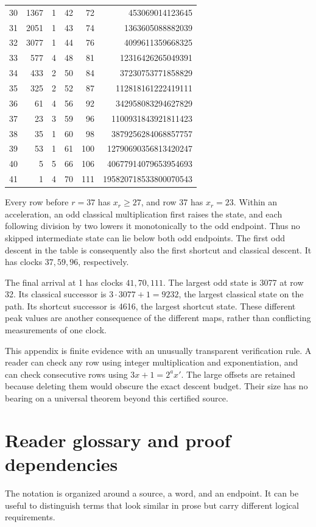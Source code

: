 \begin{longtable}{rrrrrr}
30&1367&1&42&72&453069014123645\\
31&2051&1&43&74&1363605088882039\\
32&3077&1&44&76&4099611359668325\\
33&577&4&48&81&12316426265049391\\
34&433&2&50&84&37230753771858829\\
35&325&2&52&87&112818161222419111\\
36&61&4&56&92&342958083294627829\\
37&23&3&59&96&1100931843921811423\\
38&35&1&60&98&3879256284068857757\\
39&53&1&61&100&12790690356813420247\\
40&5&5&66&106&40677914079653954693\\
41&1&4&70&111&195820718533800070543\\
\end{longtable}
\endgroup

Every row before $r=37$ has $x_r\ge27$, and row 37 has $x_r=23$. Within an acceleration, an odd classical multiplication first raises the state, and each following division by two lowers it monotonically to the odd endpoint. Thus no skipped intermediate state can lie below both odd endpoints. The first odd descent in the table is consequently also the first shortcut and classical descent. It has clocks $37,59,96$, respectively.

The final arrival at 1 has clocks $41,70,111$. The largest odd state is 3077 at row 32. Its classical successor is $3\cdot3077+1=9232$, the largest classical state on the path. Its shortcut successor is 4616, the largest shortcut state. These different peak values are another consequence of the different maps, rather than conflicting measurements of one clock.

This appendix is finite evidence with an unusually transparent verification rule. A reader can check any row using integer multiplication and exponentiation, and can check consecutive rows using $3x+1=2^a x'$. The large offsets are retained because deleting them would obscure the exact descent budget. Their size has no bearing on a universal theorem beyond this certified source.

\section{Reader glossary and proof dependencies}\label{app:glossary}
The notation is organized around a source, a word, and an endpoint. It can be useful to distinguish terms that look similar in prose but carry different logical requirements.

